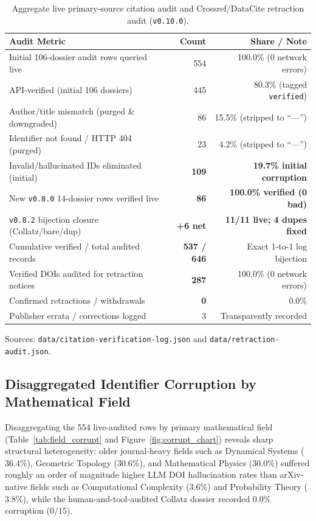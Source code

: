 \documentclass[11pt,reqno]{amsart}
\theoremstyle{plain}
\theoremstyle{definition}
\newcommand{\code}[1]{{\upshape\nolinkurl{#1}}}
\begin{document}
\begin{table}[htbp]
\centering
\caption{Aggregate live primary-source citation audit and Crossref/DataCite retraction audit (\texttt{v0.10.0}).}
\label{tab:citations}
\footnotesize
\begin{tabular}{@{}lrr@{}}
\toprule
Audit Metric & Count & Share / Note \\
\midrule
Initial 106-dossier audit rows queried live & 554 & 100.0\% (0 network errors) \\
\quad API-verified (initial 106 dossiers) & 445 & 80.3\% (tagged \code{verified}) \\
\quad Author/title mismatch (purged \& downgraded) & 86 & 15.5\% (stripped to ``---'') \\
\quad Identifier not found / HTTP 404 (purged) & 23 & 4.2\% (stripped to ``---'') \\
\quad Invalid/hallucinated IDs eliminated (initial) & \textbf{109} & \textbf{19.7\% initial corruption} \\
New \texttt{v0.8.0} 14-dossier rows verified live & \textbf{86} & \textbf{100.0\% verified (0 bad)} \\
\texttt{v0.8.2} bijection closure (Collatz/bare/dup) & \textbf{+6 net} & \textbf{11/11 live; 4 dupes fixed} \\
Cumulative verified / total audited records & \textbf{537 / 646} & Exact 1-to-1 log bijection \\
\midrule
Verified DOIs audited for retraction notices & \textbf{287} & 100.0\% (0 network errors) \\
\quad Confirmed retractions / withdrawals & \textbf{0} & 0.0\% \\
\quad Publisher errata / corrections logged & 3 & Transparently recorded \\
\bottomrule
\end{tabular}

\smallskip
{\footnotesize Sources: \code{data/citation-verification-log.json} and \code{data/retraction-audit.json}.}
\end{table}

\subsection{Disaggregated Identifier Corruption by Mathematical Field}
Disaggregating the 554 live-audited rows by primary mathematical field (Table~\ref{tab:field_corrupt}
and Figure~\ref{fig:corrupt_chart}) reveals sharp structural heterogeneity: older journal-heavy
fields such as Dynamical Systems ($36.4\%$), Geometric Topology ($30.6\%$), and Mathematical
Physics ($30.0\%$) suffered roughly an order of magnitude higher LLM DOI hallucination rates
than arXiv-native fields such as Computational Complexity ($3.6\%$) and Probability Theory
($3.8\%$), while the human-and-tool-audited Collatz dossier recorded $0.0\%$ corruption ($0/15$).
\end{document}
